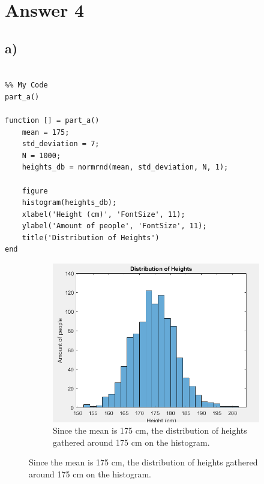 \documentclass[12pt]{article}
\begin{document}
\section*{Answer 4}

\subsection*{a)} 
\begin{lstlisting}[style=Matlab-editor]

%% My Code
part_a()

function [] = part_a()
    mean = 175;
    std_deviation = 7;
    N = 1000;
    heights_db = normrnd(mean, std_deviation, N, 1);
    
    figure
    histogram(heights_db);
    xlabel('Height (cm)', 'FontSize', 11);
    ylabel('Amount of people', 'FontSize', 11);
    title('Distribution of Heights')
end

\end{lstlisting}

\begin{figure}[H]
  \centering
  \begin{subfigure}[b]{0.4\linewidth}
    \includegraphics[width=\linewidth]{Screenshot (1458).png}
    \caption{Since the mean is 175 cm, the distribution of heights gathered around 175 cm on the histogram.}
  \end{subfigure}
\end{figure}
\end{document}
